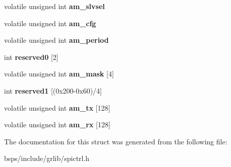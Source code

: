 \begin{DoxyCompactItemize}
\mbox{\label{structspictrl__regs_ae03af691f75f9c0af9e6abba98d51c31}} 
volatile unsigned int {\bfseries am\+\_\+slvsel}
\item 
\mbox{\label{structspictrl__regs_a415906fec29b52064483d60bacf76f62}} 
volatile unsigned int {\bfseries am\+\_\+cfg}
\item 
\mbox{\label{structspictrl__regs_a4995e287127316ea3a25e35ca93073bd}} 
volatile unsigned int {\bfseries am\+\_\+period}
\item 
\mbox{\label{structspictrl__regs_af4ff3bdc665eeb7dd06e009628d54e33}} 
int {\bfseries reserved0} \mbox{[}2\mbox{]}
\item 
\mbox{\label{structspictrl__regs_a07b21da75386d939df5640454fc71538}} 
volatile unsigned int {\bfseries am\+\_\+mask} \mbox{[}4\mbox{]}
\item 
\mbox{\label{structspictrl__regs_a5c279270b4c910491c9b41d613d3e556}} 
int {\bfseries reserved1} \mbox{[}(0x200-\/0x60)/4\mbox{]}
\item 
\mbox{\label{structspictrl__regs_ab03bfce26a57950475a4867daeac93d7}} 
volatile unsigned int {\bfseries am\+\_\+tx} \mbox{[}128\mbox{]}
\item 
\mbox{\label{structspictrl__regs_aeb21bec784670d93d9b7e7adf8d72c61}} 
volatile unsigned int {\bfseries am\+\_\+rx} \mbox{[}128\mbox{]}
\end{DoxyCompactItemize}


The documentation for this struct was generated from the following file\+:\begin{DoxyCompactItemize}
\item 
bsps/include/grlib/spictrl.\+h\end{DoxyCompactItemize}
